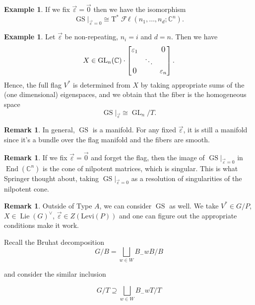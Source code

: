 \documentclass[12pt]{amsart}
\numberwithin{equation}{section}
\theoremstyle{definition}
\newtheorem{Remark}[equation]{Remark}
\newtheorem{Example}[equation]{Example}
\numberwithin{figure}{section}
\newcommand{\C}{\mathbb{C}}
\newcommand{\GL}{\operatorname{GL}}
\newcommand{\End}{\operatorname{End}}
\newcommand{\GS}{\operatorname{GS}}
\newcommand{\Fl}{\operatorname{\mathscr{F}\!\ell}}
\newcommand{\Lie}{\operatorname{Lie}}
\begin{document}
\begin{Example}
	If we fix $\overrightarrow{\varepsilon} = \overrightarrow{0}$ then we have the isomorphism
	\[
		\GS|_{\overrightarrow{\varepsilon}=0} \cong \text{T}^* \Fl(n_1, \dots, n_d; \C^n).
	\]
\end{Example}

\begin{Example}
	Let $\overrightarrow{\varepsilon}$ be non-repeating, $n_i=i$ and $d=n$. Then we have
	\[
		X \in \GL_n(\C) \cdot
		\begin{bmatrix*}
			\varepsilon_1&&\text{\large{0}}\\
			&\ddots&\\
			\text{\large{0}}&&\varepsilon_n
		\end{bmatrix*}.
	\]
	Hence, the full flag $V^*$ is determined from $X$ by taking appropriate sums of the (one dimensional) eigenspaces,
	and we obtain that the fiber is the homogeneous space
	\[
		\GS|_{\overrightarrow{\varepsilon}} \cong \GL_n / T.
	\]
\end{Example}

\begin{Remark}
	In general, $\GS$ is a manifold.
	For any fixed ${\overrightarrow{\varepsilon}}$, it is still a manifold since it's a bundle over the flag manifold and the fibers are smooth.
\end{Remark}

\begin{Remark}
	If we fix ${\overrightarrow{\varepsilon}} = {\overrightarrow{0}}$ and forget the flag, then the image of $\GS|_{\overrightarrow{\varepsilon}=0}$ in $\End(\C^n)$ is the cone of nilpotent matrices, which is singular. This is what Springer thought about, taking $\GS|_{\overrightarrow{\varepsilon}=0}$ as a resolution of singularities of the nilpotent cone.
\end{Remark}

\begin{Remark}
	Outside of Type $A$, we can consider $\GS$ as well.
	We take $V^* \in G/P$, $X \in \Lie(G)^\vee$, $\overrightarrow{\varepsilon} \in Z(\text{Levi}(P))$ and one can figure out the appropriate conditions make it work.
\end{Remark}

Recall the Bruhat decomposition
\[
	G/B = \bigsqcup_{w \in W} B_- w B / B
\]

and consider the similar inclusion

\[
	G/T \supseteq \bigsqcup_{w \in W} B_- w T/T
\]
\end{document}
